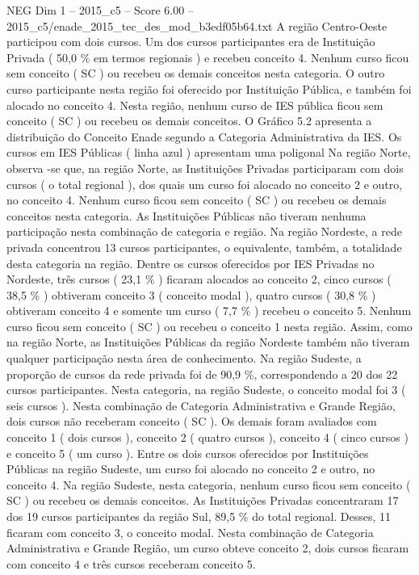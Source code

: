 \begin{textsample}{NEG Dim 1 – 2015\_c5 – Score 6.00 – 2015\_c5/enade\_2015\_tec\_des\_mod\_b3edf05b64.txt}
A região Centro-Oeste participou com dois cursos.
Um dos cursos participantes era de Instituição Privada ( 50,0 \% em termos regionais ) e recebeu conceito 4.
Nenhum curso ficou sem conceito ( SC ) ou recebeu os demais conceitos nesta categoria.
O outro curso participante nesta região foi oferecido por Instituição Pública, e também foi alocado no conceito 4.
Nesta região, nenhum curso de IES pública ficou sem conceito ( SC ) ou recebeu os demais conceitos.
O Gráfico 5.2 apresenta a distribuição do Conceito Enade segundo a Categoria Administrativa da IES.
Os cursos em IES Públicas ( linha azul ) apresentam uma poligonal Na região Norte, observa -se que, na região Norte, as Instituições Privadas participaram com dois cursos ( o total regional ), dos quais um curso foi alocado no conceito 2 e outro, no conceito 4.
Nenhum curso ficou sem conceito ( SC ) ou recebeu os demais conceitos nesta categoria.
As Instituições Públicas não tiveram nenhuma participação nesta combinação de categoria e região.
Na região Nordeste, a rede privada concentrou 13 cursos participantes, o equivalente, também, a totalidade desta categoria na região.
Dentre os cursos oferecidos por IES Privadas no Nordeste, três cursos ( 23,1 \% ) ficaram alocados ao conceito 2, cinco cursos ( 38,5 \% ) obtiveram conceito 3 ( conceito modal ), quatro cursos ( 30,8 \% ) obtiveram conceito 4 e somente um curso ( 7,7 \% ) recebeu o conceito 5.
Nenhum curso ficou sem conceito ( SC ) ou recebeu o conceito 1 nesta região.
Assim, como na região Norte, as Instituições Públicas da região Nordeste também não tiveram qualquer participação nesta área de conhecimento.
Na região Sudeste, a proporção de cursos da rede privada foi de 90,9 \%, correspondendo a 20 dos 22 cursos participantes.
Nesta categoria, na região Sudeste, o conceito modal foi 3 ( seis cursos ).
Nesta combinação de Categoria Administrativa e Grande Região, dois cursos não receberam conceito ( SC ).
Os demais foram avaliados com conceito 1 ( dois cursos ), conceito 2 ( quatro cursos ), conceito 4 ( cinco cursos ) e conceito 5 ( um curso ).
Entre os dois cursos oferecidos por Instituições Públicas na região Sudeste, um curso foi alocado no conceito 2 e outro, no conceito 4.
Na região Sudeste, nesta categoria, nenhum curso ficou sem conceito ( SC ) ou recebeu os demais conceitos.
As Instituições Privadas concentraram 17 dos 19 cursos participantes da região Sul, 89,5 \% do total regional.
Desses, 11 ficaram com conceito 3, o conceito modal.
Nesta combinação de Categoria Administrativa e Grande Região, um curso obteve conceito 2, dois cursos ficaram com conceito 4 e três cursos receberam conceito 5.

\end{textsample}
